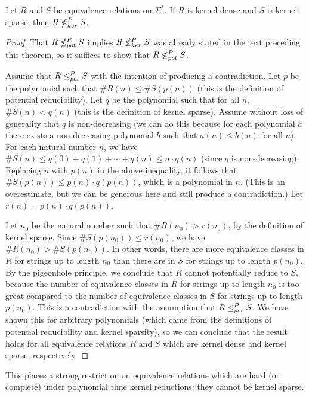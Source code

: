 \begin{theorem}\label{thm:density}
  Let $R$ and $S$ be equivalence relations on $\Sigma^*$.
  If $R$ is kernel dense and $S$ is kernel sparse, then $R\nleq^{P}_{ker} S$.
\end{theorem}
\begin{proof}
  That $R\nleq^{P}_{pot} S$ implies $R\nleq^{P}_{ker} S$ was already stated in the text preceding this theorem, so it suffices to show that $R\nleq^{P}_{pot} S$.

  Assume that $R\leq^{P}_{pot} S$ with the intention of producing a contradiction.
  Let $p$ be the polynomial such that $\#R(n)\leq \#S(p(n))$ (this is the definition of potential reducibility).
  Let $q$ be the polynomial such that for all $n$, $\#S(n)< q(n)$ (this is the definition of kernel sparse).
  Assume without loss of generality that $q$ is non-decreasing (we can do this because for each polynomial $a$ there exists a non-decreasing polynomial $b$ such that $a(n)\leq b(n)$ for all $n$).
  For each natural number $n$, we have $\#S(n) \leq q(0) + q(1) + \cdots + q(n) \leq n \cdot q(n)$ (since $q$ is non-decreasing).
  Replacing $n$ with $p(n)$ in the above inequality, it follows that $\#S(p(n)) \leq p(n) \cdot q(p(n))$, which is a polynomial in $n$.
  (This is an overestimate, but we can be generous here and still produce a contradiction.)
  Let $r(n)=p(n)\cdot q(p(n))$.

  Let $n_0$ be the natural number such that $\#R(n_0) > r(n_0)$, by the definition of kernel sparse.
  Since $\#S(p(n_0)) \leq r(n_0)$, we have $\#R(n_0) > \#S(p(n_0))$.
  In other words, there are more equivalence classes in $R$ for strings up to length $n_0$ than there are in $S$ for strings up to length $p(n_0)$.
  By the pigeonhole principle, we conclude that $R$ cannot potentially reduce to $S$, because the number of equivalence classes in $R$ for strings up to length $n_0$ is too great compared to the number of equivalence classes in $S$ for strings up to length $p(n_0)$.
  This is a contradiction with the assumption that $R\leq^{P}_{pot} S$.
  We have shown this for arbitrary polynomials (which came from the definitions of potential reducibility and kernel sparsity), so we can conclude that the result holds for all equivalence relations $R$ and $S$ which are kernel dense and kernel sparse, respectively.
\end{proof}

This places a strong restriction on equivalence relations which are hard (or complete) under polynomial time kernel reductions: they cannot be kernel sparse.

